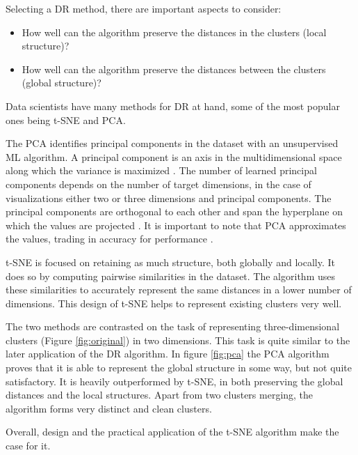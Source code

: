 Selecting a \ac{DR} method, there are important aspects to consider:
\begin{itemize}
	\item How well can the algorithm preserve the distances in the clusters (local structure)?
	\item How well can the algorithm preserve the distances between the clusters (global structure)?
\end{itemize}

Data scientists have many methods for \ac{DR} at hand, some of the most popular ones being \ac{t-SNE} and \ac{PCA}.

The \ac{PCA} identifies principal components in the dataset with an unsupervised \ac{ML} algorithm.\cite{40algorithms} A principal component is an axis in the multidimensional space along which the variance is maximized \cite{pcaVStsne}. The number of learned principal components depends on the number of target dimensions, in the case of visualizations either two or three dimensions and principal components. The principal components are orthogonal to each other and span the hyperplane on which the values are projected \cite{pcaVStsne}.
It is important to note that \ac{PCA} approximates the values, trading in accuracy for performance \cite{40algorithms}.

\ac{t-SNE} is focused on retaining as much structure, both globally and locally. It does so by computing pairwise similarities in the dataset. The algorithm uses these similarities to accurately represent the same distances in a lower number of dimensions. This design of \ac{t-SNE} helps to represent existing clusters very well.

The two methods are contrasted on the task of representing three-dimensional clusters (Figure \ref{fig:original}) in two dimensions. This task is quite similar to the later application of the \ac{DR} algorithm. In figure \ref{fig:pca} the \ac{PCA} algorithm proves that it is able to represent the global structure in some way, but not quite satisfactory. It is heavily outperformed by \ac{t-SNE}, in both preserving the global distances and the local structures. Apart from two clusters merging, the algorithm forms very distinct and clean clusters.

Overall, design and the practical application of the \ac{t-SNE} algorithm make the case for it.





